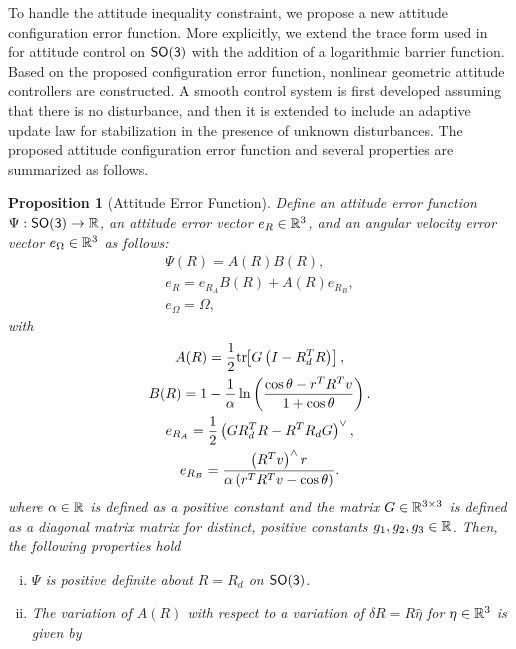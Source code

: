 \documentclass[fleqn]{IJCAS}  %
\newtheorem{prop}{Proposition}
\begin{document}
\begin{multicols}{2}
To handle the attitude inequality constraint, we propose a new attitude configuration error function. 
More explicitly, we extend the trace form used in~\cite{bullo2004,LeeITCST13} for attitude control on \(\mathsf{SO(3)}\) with the addition of a logarithmic barrier function. 
Based on the proposed configuration error function,  nonlinear geometric attitude controllers are constructed. 
A smooth control system is first developed assuming that there is  no disturbance, and then it is extended to include an adaptive update law for stabilization in the presence of unknown disturbances. 
The proposed attitude configuration error function and several properties are summarized as follows.

\begin{prop}[Attitude Error Function] \label{prop:config_error}
Define an attitude error function \( \Psi : \mathsf{SO(3)} \to \mathbb{R} \), an attitude error vector \( e_R \in \mathbb{R}^3 \), and an angular velocity error vector \( e_\Omega \in \mathbb{R}^3 \) as follows:
\begin{gather}
	\Psi(R) = A(R) B(R) , \label{eqn:psi} \\
	e_R = e_{R_A} B(R) + A(R) e_{R_B} , \label{eqn:eR} \\
	e_\Omega = \Omega , \label{eqn:eW}
\end{gather}
with
\begin{gather}
	A(R) = \frac{1}{2} \mathrm{tr}\negthickspace\left[ G \left( I - R_d^T R\right) \right] , \label{eqn:A} \\
	B(R) = 1 - \frac{1}{\alpha} \ln \left( \frac{\cos \theta -  r^T R^T v}{1 + \cos \theta}\right) . \label{eqn:B} \\
	e_{R_A} = \frac{1}{2} \left( G R_d^T R - R^T R_d G \right) ^ \vee , \label{eqn:eRA} \\
	e_{R_B} = \frac{ \left( R^T v\right)^\wedge r}{\alpha \left(r^T R^T v - \cos \theta \right)} . \label{eqn:eRB} 
\end{gather}	
where \( \alpha \in \mathbb{R} \) is defined as a positive constant and the matrix \( G \in \mathbb{R}^{3 \times 3} \) is defined as a diagonal matrix matrix for distinct, positive constants \( g_1, g_2, g_3 \in \mathbb{R} \).
Then, the following properties hold
\begin{enumerate}[(i)]
	\item \label{item:prop_psi_psd} \(\Psi\) is positive definite about \( R = R_d\) on $\mathsf{SO(3)}$.
	\item \label{item:prop_era}The variation of \( A(R) \) with respect to a variation of \( \delta R = R \hat{\eta} \) for \( \eta \in \mathbb{R}^3 \) is given by

\end{enumerate}
\end{prop}
\end{multicols}
\end{document}

